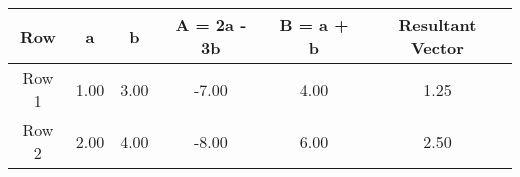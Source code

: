 


\begin{tabular}{|c|c|c|c|c|c|}
\hline
Row & a & b & A = 2a - 3b & B = a + b & Resultant Vector \\
\hline
Row 1 & 1.00 & 3.00 & -7.00 & 4.00 & 1.25 \\
Row 2 & 2.00 & 4.00 & -8.00 & 6.00 & 2.50 \\

\hline
\end{tabular}



